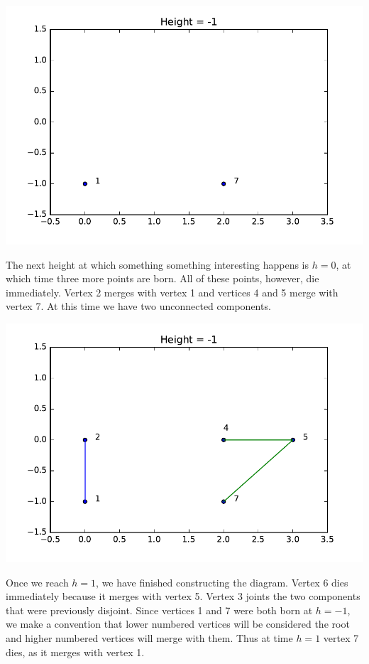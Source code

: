 \documentclass[11pt]{amsart}
\begin{document}
\includegraphics[width = \textwidth]{h1.pdf}

The next height at which something something interesting happens is $h = 0$, at which time three more points are born.  All of these points, however, die immediately.  Vertex 2 merges with vertex 1 and vertices 4 and 5 merge with vertex 7.  At this time we have two unconnected components.

\includegraphics[width = \textwidth]{persist_diag2.pdf}

Once we reach $h = 1$, we have finished constructing the diagram.  Vertex 6 dies immediately because it merges with vertex 5.  Vertex 3 joints the two components that were previously disjoint.  Since vertices 1 and 7 were both born at $h=-1$, we make a convention that lower numbered vertices will be considered the root and higher numbered vertices will merge with them.  Thus at time $h=1$ vertex 7 dies, as it merges with vertex 1.
\end{document}
